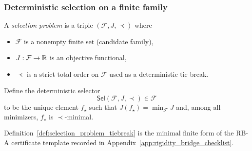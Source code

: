 \subsubsection{Deterministic selection on a finite family}
\label{subsec:branching_finite_selection}

\begin{definition}\label{def:selection_problem_tiebreak}
A \emph{selection problem} is a triple $(\mathcal{F},J,\prec)$ where
\begin{itemize}
\item $\mathcal{F}$ is a nonempty finite set (candidate family),
\item $J:\mathcal{F}\to\mathbb{R}$ is an objective functional,
\item $\prec$ is a strict total order on $\mathcal{F}$ used as a deterministic tie-break.
\end{itemize}
Define the deterministic selector
\[
\mathsf{Sel}(\mathcal{F},J,\prec)\in\mathcal{F}
\]
to be the unique element $f_\star$ such that $J(f_\star)=\min_{\mathcal{F}}J$ and, among all minimizers,
$f_\star$ is $\prec$-minimal.
\end{definition}

\begin{remark}\label{rem:rb_a_selection_problem}
Definition~\ref{def:selection_problem_tiebreak} is the minimal finite form of the RB-A certificate template
recorded in Appendix~\ref{app:rigidity_bridge_checklist}.
\end{remark}

